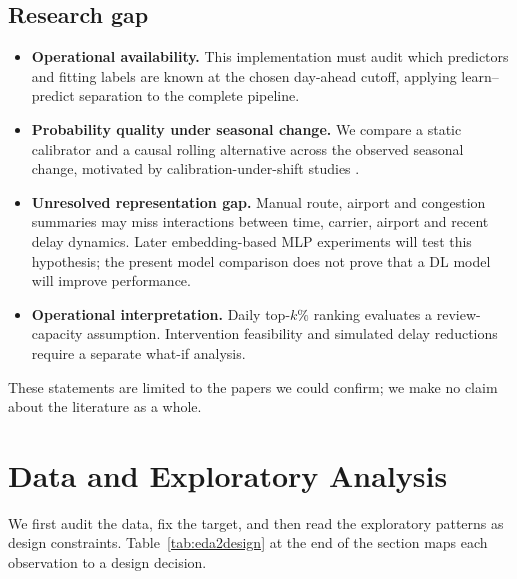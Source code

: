 \documentclass[conference]{IEEEtran}
\begin{document}
\subsection{Research gap}
\begin{itemize}
\item \textbf{Operational availability.} This implementation must audit which predictors and fitting labels are known at the chosen day-ahead cutoff, applying learn--predict separation \cite{kaufman2012leakage} to the complete pipeline.
\item \textbf{Probability quality under seasonal change.} We compare a static calibrator and a causal rolling alternative across the observed seasonal change, motivated by calibration-under-shift studies \cite{ovadia2019shift}.
\item \textbf{Unresolved representation gap.} Manual route, airport and congestion summaries may miss interactions between time, carrier, airport and recent delay dynamics. Later embedding-based MLP experiments will test this hypothesis; the present model comparison does not prove that a DL model will improve performance.
\item \textbf{Operational interpretation.} Daily top-$k\%$ ranking evaluates a review-capacity assumption. Intervention feasibility and simulated delay reductions require a separate what-if analysis.
\end{itemize}
These statements are limited to the papers we could confirm; we make no claim about the literature as a whole.

\section{Data and Exploratory Analysis}\label{sec:data}
We first audit the data, fix the target, and then read the exploratory patterns as design constraints. Table~\ref{tab:eda2design} at the end of the section maps each observation to a design decision.
\end{document}
